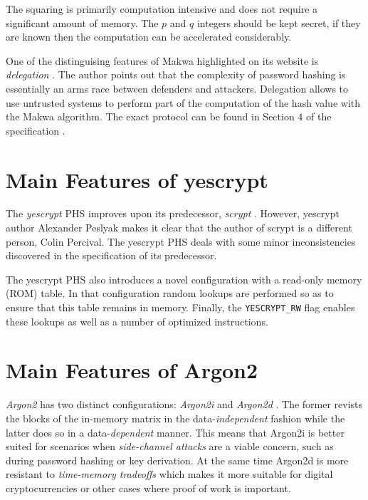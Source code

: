 The squaring is primarily computation intensive and does not require a significant amount of memory. The \(p\) and \(q\) integers should be kept secret, if they are known then the computation can be accelerated considerably.

One of the distinguising features of Makwa highlighted on its website is \emph{delegation} \cite{makwa:2017:homepage}. The author points out that the complexity of password hashing is essentially an arms race between defenders and attackers. Delegation allows to use untrusted systems to perform part of the computation of the hash value with the Makwa algorithm. The exact protocol can be found in Section 4 of the specification \cite{pornin:2015:makwa-spec}.

\section{Main Features of yescrypt}
\label{sec:yescrypt}

The \emph{yescrypt} PHS \cite{peslyak:2015:yescrypt} improves upon its predecessor, \emph{scrypt} \cite{percival:2016:scrypt}. However, yescrypt author Alexander Peslyak makes it clear that the author of scrypt is a different person, Colin Percival. The yescrypt PHS deals with some minor inconsistencies discovered in the specification of its predecessor.

The yescrypt PHS also introduces a novel configuration with a read-only memory (ROM) table. In that configuration random lookups are performed so as to ensure that this table remains in memory. Finally, the \texttt{YESCRYPT\_RW} flag enables these lookups as well as a number of optimized instructions.

\section{Main Features of Argon2}
\label{sec:argon2}

\emph{Argon2} has two distinct configurations: \emph{Argon2i} and \emph{Argon2d} \cite{biryukov:2015:argon2}. The former revists the blocks of the in-memory matrix in the data-\emph{independent} fashion while the latter does so in a data-\emph{dependent} manner. This means that Argon2i is better suited for scenarios when \emph{side-channel attacks} are a viable concern, such as during password hashing or key derivation. At the same time Argon2d is more resistant to \emph{time-memory tradeoffs} which makes it more suitable for digital cryptocurrencies or other cases where proof of work is important.

